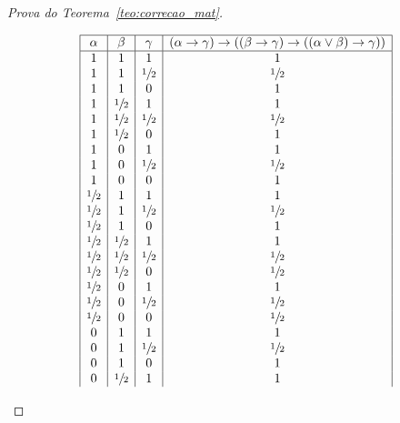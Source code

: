 \begin{proof}[Prova do Teorema~\ref{teo:correcao_mat}]
\begin{provaporcasos}
\begin{provaporsubcasos}
                    \begin{center}
                        \[
                            \begin{array}{|c|c|c|c|}%
                                \hline%
                                \alpha      & \beta & \gamma & (\alpha \to \gamma) \to ((\beta \to \gamma) \to ((\alpha \lor \beta) \to \gamma)) \\
                                \hline%
                                1 & 1 & 1 &1\\
                                1 & 1 & \meio{} &\meio{}\\
                                1 & 1 & 0 &1\\
                                1 & \meio{} & 1 &1\\
                                1 & \meio{} & \meio{} &\meio{}\\
                                1 & \meio{} & 0 &1\\
                                1 & 0 & 1 &1\\
                                1 & 0 & \meio{} &\meio{}\\
                                1 & 0 & 0 &1\\
                                \meio{} & 1 & 1 &1\\
                                \meio{} & 1 & \meio{} &\meio{}\\
                                \meio{} & 1 & 0 &1\\
                                \meio{} & \meio{} & 1 &1\\
                                \meio{} & \meio{} & \meio{} &\meio{}\\
                                \meio{} & \meio{} & 0 &\meio{}\\
                                \meio{} & 0 & 1 &1\\
                                \meio{} & 0 & \meio{} &\meio{}\\
                                \meio{} & 0 & 0 &\meio{}\\
                                0 & 1 & 1 &1\\
                                0 & 1 & \meio{} &\meio{}\\
                                0 & 1 & 0 &1\\
                                0 & \meio{} & 1 &1\\

\end{array}\]
\end{center}
\end{provaporsubcasos}
\end{provaporcasos}
\end{proof}
